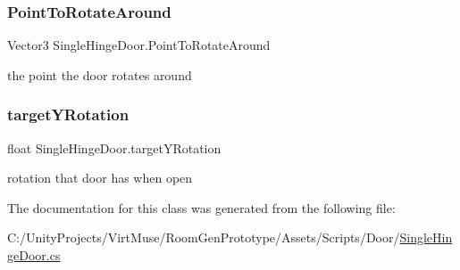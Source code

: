 \mbox{\label{class_single_hinge_door_a19b06c100fb6addbc4581a4b8e1ac82a}} 
\subsubsection{\texorpdfstring{Point\+To\+Rotate\+Around}{PointToRotateAround}}
{\footnotesize\ttfamily Vector3 Single\+Hinge\+Door.\+Point\+To\+Rotate\+Around\hspace{0.3cm}{\ttfamily [private]}}



the point the door rotates around 

\mbox{\label{class_single_hinge_door_ad7088149f79d6d1834f30b63634a7794}} 
\subsubsection{\texorpdfstring{target\+Y\+Rotation}{targetYRotation}}
{\footnotesize\ttfamily float Single\+Hinge\+Door.\+target\+Y\+Rotation\hspace{0.3cm}{\ttfamily [private]}}



rotation that door has when open 



The documentation for this class was generated from the following file\+:\begin{DoxyCompactItemize}
\item 
C\+:/\+Unity\+Projects/\+Virt\+Muse/\+Room\+Gen\+Prototype/\+Assets/\+Scripts/\+Door/\mbox{\hyperlink{_single_hinge_door_8cs}{Single\+Hinge\+Door.\+cs}}\end{DoxyCompactItemize}
